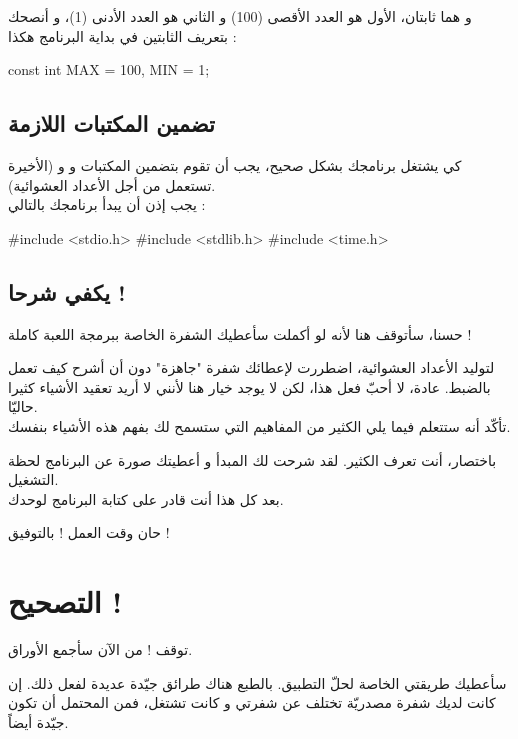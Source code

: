و 
هما ثابتان، الأول هو العدد الأقصى (100) و الثاني هو العدد الأدنى (1)، و أنصحك بتعريف الثابتين في بداية البرنامج هكذا :

\begin{Csource}
const int MAX = 100, MIN = 1;
\end{Csource}

\subsection{تضمين المكتبات اللازمة}

كي يشتغل برنامجك بشكل صحيح، يجب أن تقوم بتضمين المكتبات 
و 
و 
(الأخيرة تستعمل من أجل الأعداد العشوائية).\\
يجب إذن أن يبدأ برنامجك بالتالي :

\begin{Csource}
#include <stdio.h>
#include <stdlib.h>
#include <time.h>
\end{Csource}

\subsection{يكفي شرحا !}

حسنا، سأتوقف هنا لأنه لو أكملت سأعطيك الشفرة الخاصة ببرمجة اللعبة كاملة !

\begin{information}
لتوليد الأعداد العشوائية، اضطررت لإعطائك شفرة "جاهزة" دون أن أشرح كيف تعمل بالضبط. عادة، لا أحبّ فعل هذا، لكن لا يوجد خيار هنا لأنني لا أريد تعقيد الأشياء كثيرا حاليّا.\\
تأكّد أنه ستتعلم فيما يلي الكثير من المفاهيم التي ستسمح لك بفهم هذه الأشياء بنفسك.
\end{information}

باختصار، أنت تعرف الكثير. لقد شرحت لك المبدأ و أعطيتك صورة عن البرنامج لحظة التشغيل.\\
بعد كل هذا أنت قادر على كتابة البرنامج لوحدك.

حان وقت العمل ! بالتوفيق !

\section{التصحيح !}
توقف ! من الآن سأجمع الأوراق.

سأعطيك طريقتي الخاصة لحلّ التطبيق. بالطبع هناك طرائق جيّدة عديدة لفعل ذلك. إن كانت لديك شفرة مصدريّة تختلف عن شفرتي و كانت تشتغل، فمن المحتمل أن تكون جيّدة أيضاً.

